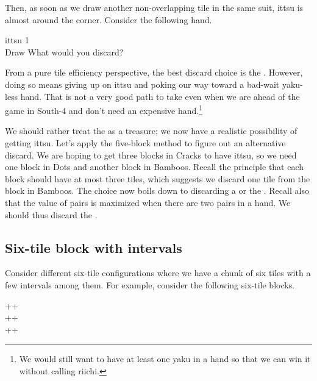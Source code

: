 \noindent
Then, as soon as we draw another non-overlapping tile in the same suit,  {\jap ittsu} is almost around the corner. 
Consider the following hand. 

\begin{itembox}[r]{{\jap ittsu} 1}
\bp
{}~\\
\hspace{290pt}\footnotesize{Draw}
\ep
\vspace{-17pt}What would you discard? \vspace{-5pt}
\end{itembox}
\noindent
From a pure tile efficiency perspective, the best discard choice is the {\large{}}.
However, doing so means giving up on {\jap ittsu} and poking our way toward a bad-wait {\jap yaku}-less hand. That is not a very good path to take even when we are ahead of the game in South-4 and don't need an expensive hand.\footnote{We would still want to have at least one {\jap yaku} in a hand so that we can win it without calling {\jap riichi}.}

\bigskip
We should rather treat the {\large{}} as a treasure; we now have a realistic possibility of getting {\jap ittsu}. Let's apply the five-block method to figure out an alternative discard.
\emj
We are hoping to get three blocks in Cracks to have {\jap ittsu}, so we need one block in Dots and another block in Bamboos. Recall the principle that each block should have at most three tiles, which suggests we discard one tile from the block in Bamboos. The choice now boils down to discarding a {\large{}} or the {\large{}}. Recall also that the value of pairs is maximized when there are two pairs in a hand. We should thus discard the {\large{}}. 

\subsection{Six-tile block with intervals}
Consider different six-tile configurations where we have a chunk of six tiles with a few intervals among them. For example, consider the following six-tile blocks. 

{\begin{center}
{\LARGE{}++}\\ [\sep]
{\LARGE{}++}\\ [\sep]
{\LARGE{}++}
\end{center}}

